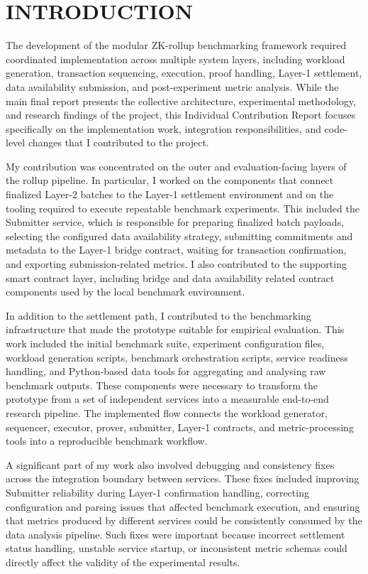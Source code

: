 \chapter{INTRODUCTION}

The development of the modular ZK-rollup benchmarking framework required coordinated implementation across multiple system layers, including workload generation, transaction sequencing, execution, proof handling, Layer-1 settlement, data availability submission, and post-experiment metric analysis. While the main final report presents the collective architecture, experimental methodology, and research findings of the project, this Individual Contribution Report focuses specifically on the implementation work, integration responsibilities, and code-level changes that I contributed to the project.

My contribution was concentrated on the outer and evaluation-facing layers of the rollup pipeline. In particular, I worked on the components that connect finalized Layer-2 batches to the Layer-1 settlement environment and on the tooling required to execute repeatable benchmark experiments. This included the Submitter service, which is responsible for preparing finalized batch payloads, selecting the configured data availability strategy, submitting commitments and metadata to the Layer-1 bridge contract, waiting for transaction confirmation, and exporting submission-related metrics. I also contributed to the supporting smart contract layer, including bridge and data availability related contract components used by the local benchmark environment.

In addition to the settlement path, I contributed to the benchmarking infrastructure that made the prototype suitable for empirical evaluation. This work included the initial benchmark suite, experiment configuration files, workload generation scripts, benchmark orchestration scripts, service readiness handling, and Python-based data tools for aggregating and analysing raw benchmark outputs. These components were necessary to transform the prototype from a set of independent services into a measurable end-to-end research pipeline. The implemented flow connects the workload generator, sequencer, executor, prover, submitter, Layer-1 contracts, and metric-processing tools into a reproducible benchmark workflow.

A significant part of my work also involved debugging and consistency fixes across the integration boundary between services. These fixes included improving Submitter reliability during Layer-1 confirmation handling, correcting configuration and parsing issues that affected benchmark execution, and ensuring that metrics produced by different services could be consistently consumed by the data analysis pipeline. Such fixes were important because incorrect settlement status handling, unstable service startup, or inconsistent metric schemas could directly affect the validity of the experimental results.

